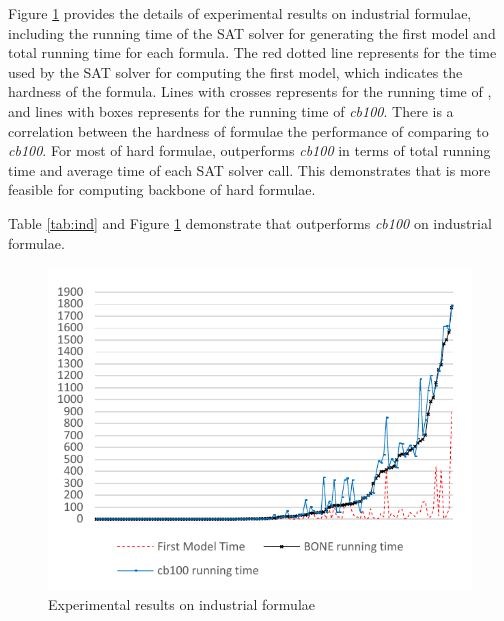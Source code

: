 Figure \ref{fig:ind-time} provides the details of experimental results on industrial formulae, including the running time of the SAT solver for generating the first model and total running time for each formula.
The red dotted line represents for the time used by the SAT solver for computing the first model, which indicates the hardness of the formula.
Lines with crosses represents for the running time of \tool, and lines with boxes represents for the running time of \textit{cb100}. There is a correlation between the hardness of formulae the performance of \tool comparing to \textit{cb100}.
For most of hard formulae, \tool outperforms \textit{cb100} in terms of total running time and average time of each SAT solver call. This demonstrates that \tool is more feasible for computing backbone of hard formulae.


Table \ref{tab:ind} and Figure \ref{fig:ind-time} demonstrate that \tool outperforms \textit{cb100} on industrial formulae.


\begin{figure}
    \centering
    \includegraphics[scale=0.8]{ind2.pdf}
   \caption{Experimental results on industrial formulae}
   \label{fig:ind-time}
\end{figure}



